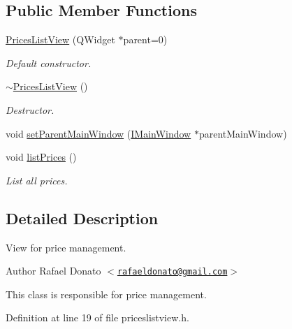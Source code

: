 \subsection*{\-Public \-Member \-Functions}
\begin{DoxyCompactItemize}
\item 
\hyperlink{class_prices_list_view_a2db0522fed15fac38cb1b7ce37508dc7}{\-Prices\-List\-View} (\-Q\-Widget $\ast$parent=0)
\begin{DoxyCompactList}\small\item\em \-Default constructor. \end{DoxyCompactList}\item 
\hyperlink{class_prices_list_view_a76daf0095b26b973e46ce458fe2d8dbd}{$\sim$\-Prices\-List\-View} ()
\begin{DoxyCompactList}\small\item\em \-Destructor. \end{DoxyCompactList}\item 
void \hyperlink{class_prices_list_view_a2016c1adec9789e3992aab995bc1daf6}{set\-Parent\-Main\-Window} (\hyperlink{class_i_main_window}{\-I\-Main\-Window} $\ast$parent\-Main\-Window)
\item 
void \hyperlink{class_prices_list_view_a8a7c21635e2e78b948f50ae667a28dfe}{list\-Prices} ()
\begin{DoxyCompactList}\small\item\em \-List all prices. \end{DoxyCompactList}\end{DoxyCompactItemize}


\subsection{\-Detailed \-Description}
\-View for price management. 

\begin{DoxyAuthor}{\-Author}
\-Rafael \-Donato $<$\href{mailto:rafaeldonato@gmail.com}{\tt rafaeldonato@gmail.\-com}$>$
\end{DoxyAuthor}
\-This class is responsible for price management. 

\-Definition at line 19 of file priceslistview.\-h.



